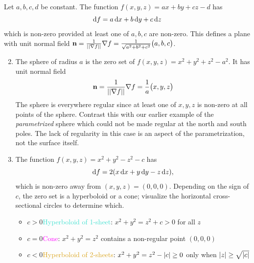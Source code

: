 \begin{examples}{}{}
\exstart Let $a,b,c,d$ be constant. The function $f(x,y,z)=ax+by+cz-d$ has 
\[{\mathrm{d} f}=a\,{\mathrm{d} x}+b\,{\mathrm{d} y}+c\,{\mathrm{d} z}\]
which is non-zero provided at least one of $a,b,c$ are non-zero. This defines a plane with unit normal field ${\mathbf{n}}=\frac 1{\left| \left| \nabla f\right|\right|}\nabla f=\frac 1{\sqrt{a^2+b^2+c^2}}\bigl(a,b,c\bigr)$.
\begin{enumerate}\setcounter{enumi}{1}
  \item The sphere of radius $a$ is the zero set of $f(x,y,z)=x^2+y^2+z^2-a^2$. It has unit normal field
  \[{\mathbf{n}}=\frac 1{\left| \left| \nabla f\right|\right|}\nabla f=\frac 1a\bigl(x,y,z\bigr)\]
The sphere is everywhere regular since at least one of $x,y,z$ is non-zero at all points of the sphere. Contrast this with our earlier example of the \emph{parametrized} sphere which could not be made regular at the north and south poles. The lack of regularity in this case is an aspect of the parametrization, not the surface itself.
	\item The function $f(x,y,z)=x^2+y^2-z^2-c$ has
	\[{\mathrm{d} f}=2(x\,{\mathrm{d} x}+y\,{\mathrm{d} y}-z\,{\mathrm{d} z}),\]
	which is non-zero away from $(x,y,z)=(0,0,0)$. Depending on the sign of $c$, the zero set is a hyperboloid or a cone; visualize the horizontal cross-sectional circles to determine which.
	\begin{itemize}
  	\item[]$c>0$\quad \textcolor{Turquoise}{Hyperboloid of 1-sheet}: $x^2+y^2=z^2+c>0$ for all $z$
  	\item[]$c=0$\quad \textcolor{Magenta}{Cone}: $x^2+y^2=z^2$ contains a non-regular point $(0,0,0)$
  	\item[]$c<0$\quad \textcolor{Goldenrod}{Hyperboloid of 2-sheets}: $x^2+y^2=z^2-\left| c\right|\ge 0$ only when $\left| z\right|\ge \sqrt{\left| c\right|}$
	\end{itemize}
	\begin{center}

\end{center}
\end{enumerate}
\end{examples}
